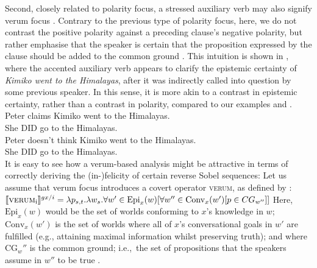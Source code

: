Second, closely related to polarity focus, a stressed auxiliary verb may also signify verum focus \parencite{Hohle1992,Richter1993,Romero2004}. Contrary to the previous type of polarity focus, here, we do not contrast the positive polarity against a preceding clause's negative polarity, but rather emphasise that the speaker is certain that the proposition expressed by the clause should be added to the common ground \parencite{Hohle1992,Gutzmann2011,Romero2004,Romero2015,Gutzmann2020}. This intuition is shown in , where the accented auxiliary verb appears to clarify the epistemic certainty of \textit{Kimiko went to the Himalayas}, after it was indirectly called into question by some previous speaker. In this sense, it is more akin to a contrast in epistemic certainty, rather than a contrast in polarity, compared to our examples  and .
\pex[nopreamble=true]%
\a{} {} Peter claims Kimiko went to the Himalayas.\\
 She \MakeUppercase{did} go to the Himalayas.\\\emptyfill\parencite[adapted from][p.~630]{Romero2004}
\a{} {} Peter doesn't think Kimiko went to the Himalayas.\\
 She \MakeUppercase{did} go to the Himalayas.\\\emptyfill\parencite[adapted from][p.~630]{Romero2004}
\xe
It is easy to see how a verum-based analysis might be attractive in terms of correctly deriving the (in-)felicity of certain reverse Sobel sequences: Let us assume that verum focus introduces a covert operator {\scshape verum}, as defined by \textcite{Romero2004}:
\ex{}
$\intension[gx/i]{{\scshape verum}\textsubscript{i}} = \lambda{p_{s,t}}.\lambda{w_s}.\forall{w'\in\text{Epi}_x(w)}[\forall{w''\in\text{Conv}_x(w')}[p\in CG_{w''}]]$
\xe
Here, $\text{Epi}_x(w)$ would be the set of worlds conforming to $x$’s knowledge in $w$; $\text{Conv}_x(w')$ is the set of worlds where all of $x$'s conversational goals in $w'$ are fulfilled (e.g., attaining maximal information whilst preserving truth); and where $\text{CG}_w''$ is the common ground; i.e.,~the set of propositions that the speakers assume in $w''$ to be true \parencite{Stalnaker1978}.

